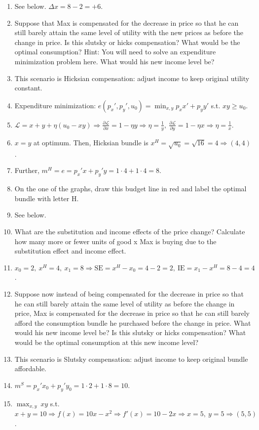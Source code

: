 \documentclass{article}
\begin{document}
\begin{enumerate}
\begin{enumerate}[label=(\alph*)]
\item[] See below. $\Delta x=8-2=+6$. 
\item Suppose that Max is compensated for the decrease in price so that he can still barely attain the same level of utility with the new prices as before the change in price. Is this slutsky or hicks compensation? What would be the optimal consumption? Hint: You will need to solve an expenditure minimization problem here. What would his new income level be?
\item[] This scenario is Hicksian compensation: adjust income to keep original utility constant.
\item[] Expenditure minimization: $e(p_x',p_y',u_0)=\min_{x,y}p_xx'+p_yy'$ s.t. $xy\geq u_0$.
\item[] $\mathcal{L}=x+y+\eta(u_0-xy)\Rightarrow \frac{\partial \mathcal{L}}{\partial x}=1-\eta y \Rightarrow\eta=\frac{1}{y}, \ \frac{\partial \mathcal{L}}{\partial y}=1-\eta x \Rightarrow\eta=\frac{1}{x}$.
\item[] $x=y$ at optimum. Then, Hicksian bundle is $x^H=\sqrt{u_0}=\sqrt{16}=4 \Rightarrow (4,4)$.
\item[] Further, $m^H=e=p_x'x+p_y'y=1\cdot 4+1\cdot 4=8$.
\item On the one of the graphs, draw this budget line in red and label the optimal bundle with letter H.
\item[] See below.
\item What are the substitution and income effects of the price change? Calculate how many more or fewer units of good x Max is buying due to the substitution effect and income effect.
\item[] $x_0=2, \ x^H=4, \ x_1=8 \Rightarrow \text{SE}=x^H-x_0=4-2=2, \ \text{IE}=x_1-x^H=8-4=4$.
\item Suppose now instead of being compensated for the decrease in price so that he can still barely attain the same level of utility as before the change in price, Max is compensated for the decrease in price so that he can still barely afford the consumption bundle he purchased before the change in price. What would his new income level be? Is this slutsky or hicks compensation? What would be the optimal consumption at this new income level?
\item[] This scenario is Slutsky compensation: adjust income to keep original bundle affordable.
\item[] $m^S=p_x'x_0+p_y'y_0=1\cdot 2+1\cdot 8=10$.
\item[] $\max_{x,y} \ xy$ s.t. $x+y=10 \Rightarrow f(x)=10x-x^2\Rightarrow f'(x)=10-2x \Rightarrow x=5, \ y=5 \Rightarrow (5,5)$.

\end{enumerate}
\end{enumerate}
\end{document}
